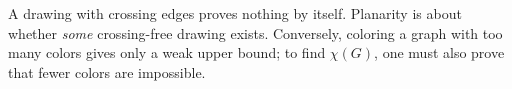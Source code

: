 \begin{commonmistake}[title={Final warning for Handout 09}]
A drawing with crossing edges proves nothing by itself. Planarity is about whether \emph{some} crossing-free drawing exists. Conversely, coloring a graph with too many colors gives only a weak upper bound; to find \(\chi(G)\), one must also prove that fewer colors are impossible.
\end{commonmistake}
